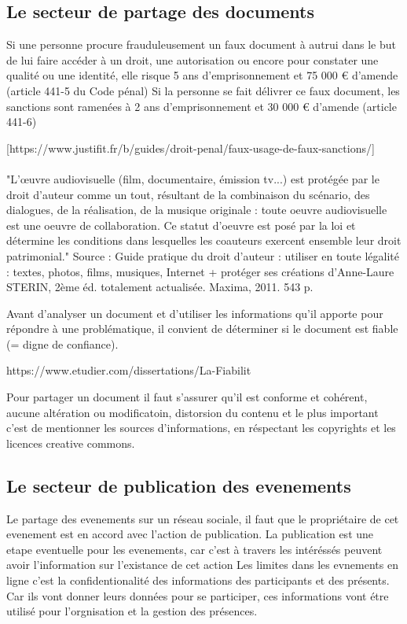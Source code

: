 \documentclass[12pt]{report}
\begin{document}
\subsection{Le secteur de partage des documents}
Si une personne procure frauduleusement un faux document à autrui dans le but de lui faire accéder à un droit, une autorisation ou encore pour constater une qualité ou une identité, elle risque 5 ans d'emprisonnement et 75 000 € d'amende (article 441-5 du Code pénal) Si la personne se fait délivrer ce faux document, les sanctions sont ramenées à 2 ans d’emprisonnement et 30 000 € d’amende (article 441-6)

[https://www.justifit.fr/b/guides/droit-penal/faux-usage-de-faux-sanctions/]
\\\\
"L’œuvre audiovisuelle (film, documentaire, émission tv...) est protégée par le droit d'auteur comme un tout, résultant de la combinaison du scénario, des dialogues, de la réalisation, de la musique originale : toute oeuvre audiovisuelle est une oeuvre de collaboration. Ce statut d'oeuvre est posé par la loi et détermine les conditions dans lesquelles les coauteurs exercent ensemble leur droit patrimonial."
Source : Guide pratique du droit d’auteur : utiliser en toute légalité : textes, photos, films, musiques, Internet + protéger ses créations d'Anne-Laure STERIN, 2ème éd. totalement actualisée. Maxima, 2011. 543 p.

Avant d’analyser un document et d’utiliser les informations qu’il apporte pour répondre à une problématique, il convient de déterminer si le document est fiable (= digne de confiance).


https://www.etudier.com/dissertations/La-Fiabilit%


Pour partager un document il faut s'assurer qu'il est conforme et cohérent, aucune altération ou modificatoin, distorsion du contenu et le plus important c'est de mentionner les sources d'informations, en réspectant les copyrights et les licences creative commons.

\subsection{Le secteur de publication des evenements}

Le partage des evenements sur un réseau sociale, il faut que le propriétaire de cet evenement est en accord avec l'action de publication.
La publication est une etape eventuelle pour les evenements, car c'est à travers les intéréssés peuvent avoir l'information sur l'existance de cet action
Les limites dans les evnements en ligne c'est la confidentionalité des informations des participants et des présents. Car ils vont donner leurs données pour se participer, ces informations vont étre utilisé pour l'orgnisation et la gestion des présences. 
\end{document}
